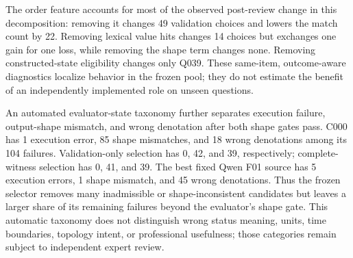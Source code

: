 \documentclass[information,article,submit,moreauthors]{Definitions/mdpi}
\begin{document}
\begin{table}[htbp]
\caption{Post-review role-utilization and single-component diagnostics under the unified evaluator. Changes, gains, and losses are relative to the stated parent and use the original candidate order.}
\label{tab:role-ablation}
\centering
\small
{}
\end{table}

The order feature accounts for most of the observed post-review change in this decomposition: removing it changes 49 validation choices and lowers the match count by 22. Removing lexical value hits changes 14 choices but exchanges one gain for one loss, while removing the shape term changes none. Removing constructed-state eligibility changes only Q039. These same-item, outcome-aware diagnostics localize behavior in the frozen pool; they do not estimate the benefit of an independently implemented role on unseen questions.

An automated evaluator-state taxonomy further separates execution failure, output-shape mismatch, and wrong denotation after both shape gates pass. C000 has 1 execution error, 85 shape mismatches, and 18 wrong denotations among its 104 failures. Validation-only selection has 0, 42, and 39, respectively; complete-witness selection has 0, 41, and 39. The best fixed Qwen F01 source has 5 execution errors, 1 shape mismatch, and 45 wrong denotations. Thus the frozen selector removes many inadmissible or shape-inconsistent candidates but leaves a larger share of its remaining failures beyond the evaluator's shape gate. This automatic taxonomy does not distinguish wrong status meaning, units, time boundaries, topology intent, or professional usefulness; those categories remain subject to independent expert review.
\end{document}
